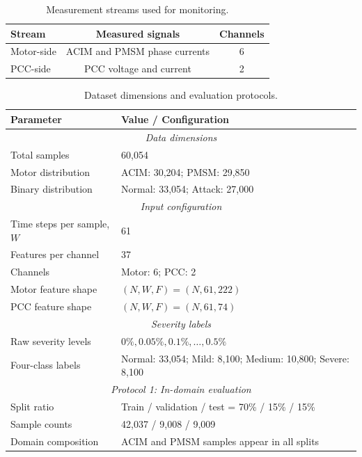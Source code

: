 \documentclass[lettersize,journal]{IEEEtran}
\begin{document}
\begin{table}[t]
\centering
\caption{Measurement streams used for monitoring.}
\label{tab:measurement_streams}
\renewcommand{\arraystretch}{1.15}
\begin{tabular}{l c c}
\hline
Stream & Measured signals & Channels \\
\hline
Motor-side & ACIM and PMSM phase currents & 6 \\
PCC-side   & PCC voltage and current & 2 \\
\hline
\end{tabular}
\end{table}                       

\begin{table}[t]
\centering
\caption{Dataset dimensions and evaluation protocols.}
\label{tab:evaluation_protocols}
\footnotesize
\renewcommand{\arraystretch}{1.15}
\setlength{\tabcolsep}{3.5pt}
\begin{tabularx}{\columnwidth}{@{}p{}X@{}}
\toprule
\textbf{Parameter} & \textbf{Value / Configuration} \\
\hline
\multicolumn{2}{c}{\textit{Data dimensions}} \\
\hline
Total samples       & 60,054 \\
Motor distribution  & ACIM: 30,204; PMSM: 29,850 \\
Binary distribution & Normal: 33,054; Attack: 27,000 \\

\hline
\multicolumn{2}{c}{\textit{Input configuration}} \\
\hline
Time steps per sample, $W$ & 61 \\
Features per channel       & 37 \\
Channels                   & Motor: 6; PCC: 2 \\
Motor feature shape         & $(N,W,F)=(N,61,222)$ \\
PCC feature shape           & $(N,W,F)=(N,61,74)$ \\
\hline
\multicolumn{2}{c}{\textit{Severity labels}} \\
\hline
Raw severity levels & $0\%, 0.05\%, 0.1\%, \ldots, 0.5\%$ \\
Four-class labels   & Normal: 33,054; Mild: 8,100; Medium: 10,800; Severe: 8,100 \\

\hline
\multicolumn{2}{c}{\textit{Protocol 1: In-domain evaluation}} \\
\hline
Split ratio    & Train / validation / test = 70\% / 15\% / 15\% \\
Sample counts  & 42,037 / 9,008 / 9,009 \\
Domain composition & ACIM and PMSM samples appear in all splits \\


\end{tabularx}
\end{table}
\end{document}
